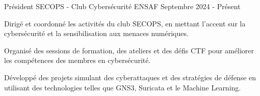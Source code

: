 
\begin{cventries}

    \cventry
    {Président} %
    {SECOPS - Club Cybersécurité} %
    {ENSAF} %
    {Septembre 2024 - Présent} %
    {
        \begin{cvitems} %
            \item {Dirigé et coordonné les activités du club SECOPS, en mettant l'accent sur la cybersécurité et la sensibilisation aux menaces numériques.}
            \item {Organisé des sessions de formation, des ateliers et des défis CTF pour améliorer les compétences des membres en cybersécurité.}
            \item {Développé des projets simulant des cyberattaques et des stratégies de défense en utilisant des technologies telles que GNS3, Suricata et le Machine Learning.}
        \end{cvitems}
    }

\end{cventries}